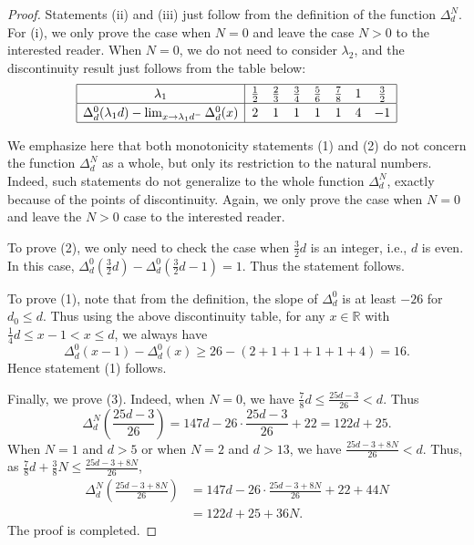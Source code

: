 \documentclass[a4paper,11pt]{amsart}
\newcommand{\RR}{\ensuremath{\mathbb{R}}}
\theoremstyle{definition}
\theoremstyle{remark}
\numberwithin{equation}{section}
\begin{document}
\begin{proof}
	Statements (ii) and (iii) just follow from the definition of the function $\Delta^N_d$. For (i), we only prove the case when $N = 0$ and leave the case $N > 0$ to the interested reader. When $N = 0$, we do not need to consider $\lambda_2$, and the discontinuity result just follows from the table below:
	\[
    \renewcommand{\arraystretch}{1.2}
	\begin{array}{|c|ccccccc|}
		\hline
		\lambda_1 & \frac12 &\frac23&\frac34&\frac56&\frac78&1&\frac32\\
		\hline 
		\Delta^0_d(\lambda_1 d) - \lim_{x \rightarrow {\lambda_1 d}^-}\Delta^0_d(x) & 2 &1&1&1&1&4&-1\\
		\hline
	\end{array}
	\]
	
	We emphasize here that both monotonicity statements (1) and (2) do not concern the function $\Delta^N_d$ as a whole, but only its restriction to the natural numbers. Indeed, such statements do not generalize to the whole function $\Delta^N_d$, exactly because of the points of discontinuity. Again, we only prove the case when $N = 0$ and leave the $N > 0$ case to the interested reader.
	
	To prove (2), we only need to check the case when $\frac32d$ is an integer, i.e., $d$ is even. In this case, $\Delta^0_d(\frac32 d) - \Delta^0_d(\frac32 d-1) = 1$. Thus the statement follows.
	
	To prove (1), note that from the definition, the slope of $\Delta^0_d$ is at least $-26$ for $d_0\le d$. Thus using the above discontinuity table, for any $x \in \RR$ with $\frac14 d \le x - 1 < x \le d$, we always have 
	$$
	\Delta^0_d(x - 1) - \Delta^0_d(x) \ge 26 - (2 + 1 + 1 + 1 + 1 + 4) = 16.
	$$
	Hence statement (1) follows.
	
	Finally, we prove (3). Indeed, when $N = 0$, we have $\frac78 d \le \frac{25d - 3}{26} < d$. Thus
	$$
	\Delta^N_d \left( \frac{25d - 3}{26} \right) = 147d - 26 \cdot \frac{25d - 3}{26} + 22 = 122d + 25.
	$$
	When $N = 1$ and $d > 5$ or when $N = 2$ and $d > 13$, we have $ \frac{25d - 3 + 8N}{26} < d$. Thus, as $\frac78d + \frac38 N \le \frac{25d - 3 + 8N}{26} $,
	\begin{align*}
		\Delta^N_d \left( \frac{25d - 3 + 8N}{26} \right) & = 147d - 26 \cdot \frac{25d - 3 + 8N}{26} + 22 + 44N \\
		& = 122d + 25 + 36N.
	\end{align*}
	The proof is completed.
\end{proof}
\end{document}
